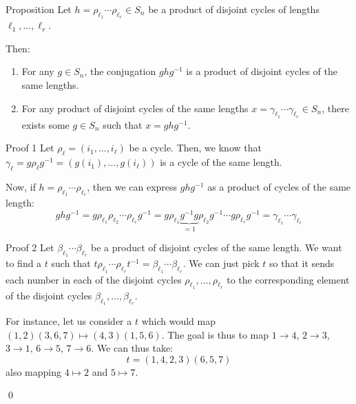 \documentclass[a4paper]{article}
\begin{document}
\begin{parag}{Proposition}
    Let $h = \rho_{\ell _1} \cdots \rho_{\ell _r} \in S_n$ be a product of disjoint cycles of lengths $\ell_1, \ldots, \ell _r$.

    Then:
    \begin{enumerate}
        \item For any $g \in S_n$, the conjugation $g h g^{-1}$ is a product of disjoint cycles of the same lengths.
        \item For any product of disjoint cycles of the same lengths $x = \gamma_{\ell _1} \cdots \gamma_{\ell _r} \in S_n$, there exists some $g \in S_n$ such that $x = g h g^{-1}$.
    \end{enumerate}

    \begin{subparag}{Proof 1}
        Let $\rho_{\ell} = \left(i_1, \ldots, i_{\ell }\right)$ be a cycle. Then, we know that $\gamma_{\ell } = g \rho_{\ell } g^{-1} = \left(g\left(i_1\right), \ldots, g\left(i_{\ell }\right)\right)$ is a cycle of the same length.

        Now, if $h = \rho_{\ell _1} \cdots \rho_{\ell _r}$, then we can express $g h g^{-1}$ as a product of cycles of the same length: 
        \[g h g^{-1} = g \rho_{\ell _1} \rho_{\ell _2} \cdots \rho_{\ell _r} g^{-1} = g \rho_{\ell _1} \underbrace{g^{-1} g}_{= 1} \rho_{\ell _2} g^{-1} \cdots g \rho_{\ell _r} g^{-1} = \gamma_{\ell _1} \cdots \gamma_{\ell _r}\]
    \end{subparag}

    \begin{subparag}{Proof 2}
        Let $\beta_{\ell _1} \cdots \beta_{\ell _r}$ be a product of disjoint cycles of the same length. We want to find a $t$ such that $t \rho_{\ell _1} \cdots \rho_{\ell _r} t^{-1} = \beta_{\ell _1} \cdots \beta_{\ell _r}$. We can just pick $t$ so that it sends each number in each of the disjoint cycles $\rho_{\ell _1}, \ldots, \rho_{\ell _r}$ to the corresponding element of the disjoint cycles $\beta_{\ell _1}, \ldots, \beta_{\ell_r}$.

        For instance, let us consider a $t$ which would map $\left(1, 2\right)\left(3, 6, 7\right) \mapsto \left(4, 3\right)\left(1, 5, 6\right)$. The goal is thus to map $1\to4$, $2\to3$, $3\to1$, $6\to5$, $7\to6$. We can thus take: 
        \[t = \left(1, 4, 2, 3\right)\left(6, 5, 7\right)\]
        also mapping $4 \mapsto 2$ and $5 \mapsto 7$.

        \qed
    \end{subparag}
\end{parag}
\end{document}
